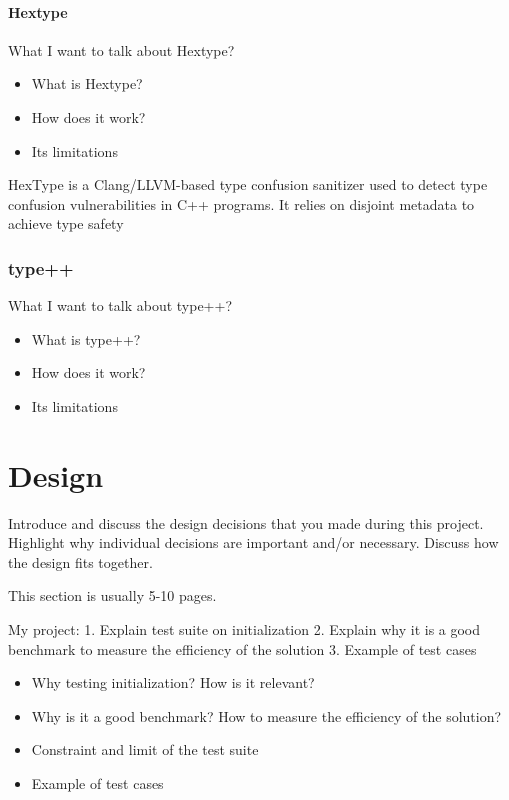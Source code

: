 \documentclass[a4paper,11pt,oneside]{report}
\begin{document}
\subsubsection{Hextype}

What I want to talk about Hextype?
\begin{itemize}
       \item What is Hextype?
       \item How does it work?
       \item Its limitations
\end{itemize}

HexType is a Clang/LLVM-based type confusion sanitizer used to detect type confusion vulnerabilities in C++ programs. It relies on disjoint metadata to achieve type safety 

\subsection{type++}

What I want to talk about type++?
\begin{itemize}
       \item What is type++?
       \item How does it work?
       \item Its limitations
\end{itemize}



\chapter{Design}

Introduce and discuss the design decisions that you made during this project.
Highlight why individual decisions are important and/or necessary. Discuss
how the design fits together.

This section is usually 5-10 pages.

My project:
1. Explain test suite on initialization 
2. Explain why it is a good benchmark to measure the efficiency of the solution
3. Example of test cases

\begin{itemize}
       \item Why testing initialization? How is it relevant?
       \item Why is it a good benchmark? How to measure the efficiency of the solution?
       \item Constraint and limit of the test suite
       \item Example of test cases

\end{itemize}
\end{document}
